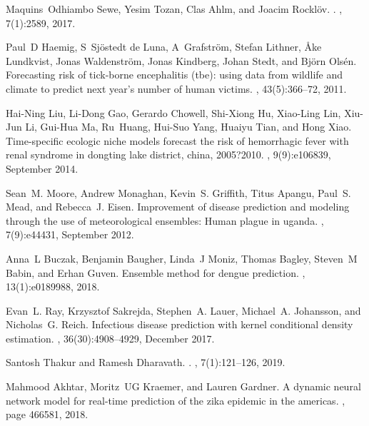 \documentclass[a4paper]{article}
\begin{document}
\begin{thebibliography}{100}
Maquins~Odhiambo Sewe, Yesim Tozan, Clas Ahlm, and Joacim Rockl{\"{o}}v.
.
, 7(1):2589, 2017.

Paul~D Haemig, S~{Sj{\"{o}}stedt de Luna}, A~Grafstr{\"{o}}m, Stefan Lithner,
  {\AA}ke Lundkvist, Jonas Waldenstr{\"{o}}m, Jonas Kindberg, Johan Stedt, and
  Bj{\"{o}}rn Ols{\'{e}}n.
\newblock Forecasting risk of tick-borne encephalitis (tbe): using data from
  wildlife and climate to predict next year's number of human victims.
, 43(5):366--72,
  2011.

Hai-Ning Liu, Li-Dong Gao, Gerardo Chowell, Shi-Xiong Hu, Xiao-Ling Lin,
  Xiu-Jun Li, Gui-Hua Ma, Ru~Huang, Hui-Suo Yang, Huaiyu Tian, and Hong Xiao.
\newblock Time-specific ecologic niche models forecast the risk of hemorrhagic
  fever with renal syndrome in dongting lake district, china, 2005?2010.
, 9(9):e106839, September 2014.

Sean~M. Moore, Andrew Monaghan, Kevin~S. Griffith, Titus Apangu, Paul~S. Mead,
  and Rebecca~J. Eisen.
\newblock Improvement of disease prediction and modeling through the use of
  meteorological ensembles: Human plague in uganda.
, 7(9):e44431, September 2012.

Anna~L Buczak, Benjamin Baugher, Linda~J Moniz, Thomas Bagley, Steven~M Babin,
  and Erhan Guven.
\newblock Ensemble method for dengue prediction.
, 13(1):e0189988, 2018.

Evan~L. Ray, Krzysztof Sakrejda, Stephen~A. Lauer, Michael~A. Johansson, and
  Nicholas~G. Reich.
\newblock Infectious disease prediction with kernel conditional density
  estimation.
, 36(30):4908--4929, December 2017.

Santosh Thakur and Ramesh Dharavath.
.
, 7(1):121--126, 2019.

Mahmood Akhtar, Moritz~UG Kraemer, and Lauren Gardner.
\newblock A dynamic neural network model for real-time prediction of the zika
  epidemic in the americas.
, page 466581, 2018.


\end{thebibliography}
\end{document}
